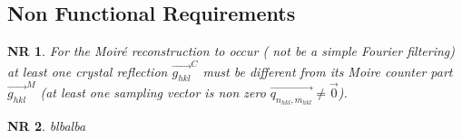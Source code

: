 \documentclass[12pt]{article}
\newtheorem{NR}{NR}
\begin{document}
\subsection{Non Functional Requirements}

\begin{NR}
\label{NR_1}
\normalfont For the Moir{\'e} reconstruction to occur ( not be a simple Fourier filtering) at least one crystal reflection $\overrightarrow{g_{hkl}}^{C}$ must be different from its Moire counter part $\overrightarrow{g_{hkl}}^{M}$ (at least one sampling vector is non zero $\overrightarrow{q_{n_{hkl},m_{hkl}}} \neq \overrightarrow{0}$).
\end{NR}

\begin{NR}
\label{NR_2}
blbalba
\end{NR}
\end{document}
